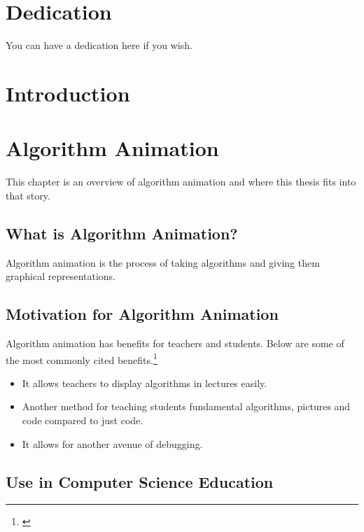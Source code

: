 \documentclass[12pt,twoside]{reedthesis}
\begin{document}
	\chapter*{Dedication}
	You can have a dedication here if you wish.

  \mainmatter %
  \pagestyle{fancyplain} %


    \chapter*{Introduction}

\chapter{Algorithm Animation}
This chapter is an overview of algorithm animation and where this thesis fits into that story. 
	
\section{What is Algorithm Animation?}
Algorithm animation is the process of taking algorithms and giving them graphical representations.
 
\section{Motivation for Algorithm Animation}
Algorithm animation has benefits for teachers and students. Below are some of the most commonly cited benefits.\footnote{\cite{hundhausen_meta-study_2002}}
\begin{itemize}
\item It allows teachers to display algorithms in lectures easily.
\item Another method for teaching students fundamental algorithms, pictures and code compared to just code.
\item It allows for another avenue of debugging. 
\end{itemize}


\section{Use in Computer Science Education}
\end{document}
